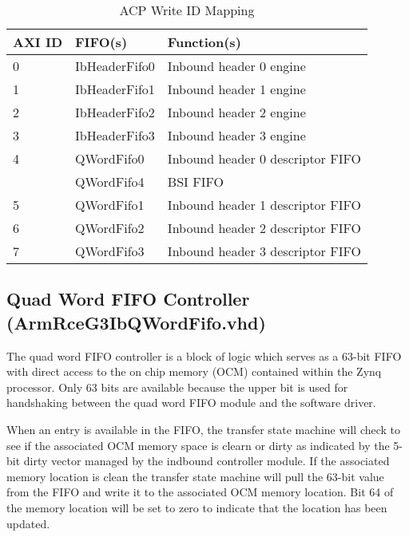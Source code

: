 \documentclass[11pt]{article}
\begin{document}
\begin{table}[H]
\small
\centering
   \begin{tabular}{| l | l | l |}
      \hline \textbf{AXI ID} & \textbf{FIFO(s)}      & \textbf{Function(s)}    \\
      \hline 0               & IbHeaderFifo0         & Inbound header 0 engine \\
      \hline 1               & IbHeaderFifo1         & Inbound header 1 engine \\
      \hline 2               & IbHeaderFifo2         & Inbound header 2 engine \\
      \hline 3               & IbHeaderFifo3         & Inbound header 3 engine \\
      \hline 4               & QWordFifo0            & Inbound header 0 descriptor FIFO    \\
                             & QWordFifo4            & BSI FIFO                \\
      \hline 5               & QWordFifo1            & Inbound header 1 descriptor FIFO   \\
      \hline 6               & QWordFifo2            & Inbound header 2 descriptor FIFO   \\
      \hline 7               & QWordFifo3            & Inbound header 3 descriptor FIFO   \\
      \hline
   \end{tabular}
   \caption{ACP Write ID Mapping}
   \label{tab:ib_id_mappings}
\end{table}

\subsection{Quad Word FIFO Controller (ArmRceG3IbQWordFifo.vhd)}
\label{subsec:ArmRceG3IbQWordFifo}

The quad word FIFO controller is a block of logic which serves as a 63-bit FIFO with direct access to the on chip memory (OCM) contained within the 
Zynq processor. Only 63 bits are available because the upper bit is used for handshaking between the quad word FIFO module and the software 
driver. 

When an entry is available in the FIFO, the transfer state machine will check to see if the associated OCM memory space
is clearn or dirty as indicated by the 5-bit dirty vector managed by the indbound controller module. If the associated memory location 
is clean the transfer state machine will pull the 63-bit value from the FIFO and write it to the associated OCM memory location. Bit 64
of the memory location will be set to zero to indicate that the location has been updated.
\end{document}
